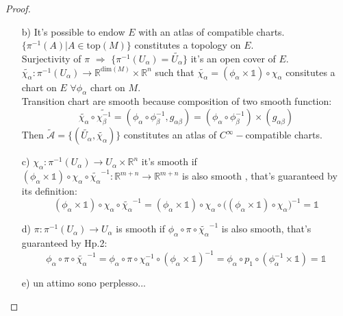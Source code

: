 \documentclass[a4paper,12pt]{scrartcl}    %
\begin{document}
\begin{proof}
\begin{itemize}
\item[b)] It's possible to endow $E$ with an atlas of compatible charts.
	\\
	$\{\pi^{-1}(A) \vert A \in \textrm{top}(M) \}$ constitutes a topology on $E$.
	\\
	Surjectivity of $\pi$ $\Rightarrow$ $\{\pi^{-1}(U_\alpha) =\tilde{U_\alpha} \}$ it's an open cover of $E$.
	\\
	$\tilde{\chi_\alpha}: \pi^{-1}(U_\alpha) \rightarrow \mathbb{R}^{\textrm{dim}(M)}\times \mathbb{R}^n$ such that $\tilde{\chi_\alpha} = ( \phi_\alpha \times \mathbb{1} ) \circ \chi_\alpha$ consitutes a chart on $E$ $\forall \phi_\alpha$ chart on  $M$.
	\\
	Transition chart are smooth because composition of two smooth function:
	\begin{displaymath}
	\tilde{\chi_\alpha}\circ \tilde{\chi_\beta^{-1}} = (\phi_\alpha \circ \phi_\beta^{-1}, g_{\alpha \beta} )
	=(\phi_\alpha \circ \phi_\beta^{-1}) \times ( g_{\alpha \beta} )
	\end{displaymath}
	\vspace{5mm}
	Then $\tilde{\mathcal{A}} = \{( \tilde{U_\alpha}, \tilde{\chi_\alpha} ) \}$ constitutes an atlas of $C^\infty-$compatible charts.

\item[c)] $\chi_\alpha: \pi^{-1}(U_\alpha) \rightarrow U_\alpha \times \mathbb{R}^n$ it's smooth if $(\phi_\alpha \times \mathbb{1}) \circ \chi_\alpha \circ \tilde{\chi_\alpha}^{-1}: \mathbb{R}^{m+n}\rightarrow \mathbb{R}^{m+n}$ is also smooth , that's guaranteed by its definition:
	\begin{displaymath}
	(\phi_\alpha \times \mathbb{1}) \circ \chi_\alpha \circ \tilde{\chi_\alpha}^{-1}= (\phi_\alpha \times \mathbb{1}) \circ \chi_\alpha \circ \big( (\phi_\alpha \times \mathbb{1}) \circ \chi_\alpha \big)^{-1} = \mathbb{1}
	\end{displaymath}	 
\item[d)] $\pi : \pi^{-1}(U_\alpha) \rightarrow U_\alpha $ is smooth if $\phi_\alpha \circ \pi \circ \tilde{\chi_\alpha}^{-1}$ is also smooth, that's guaranteed by Hp.2:
	\begin{displaymath}
		\phi_\alpha \circ \pi \circ \tilde{\chi_\alpha}^{-1} =
		\phi_\alpha \circ \pi \circ \chi_{\alpha}^{-1} \circ (\phi_\alpha \times \mathbb{1})^{-1} =
		\phi_\alpha \circ p_1 \circ ( \phi_\alpha^{-1} \times \mathbb{1} ) = \mathbb{1}
	\end{displaymath}
	
	\item[e)]	un attimo sono perplesso...
	
\end{itemize}


\end{proof}
\end{document}
